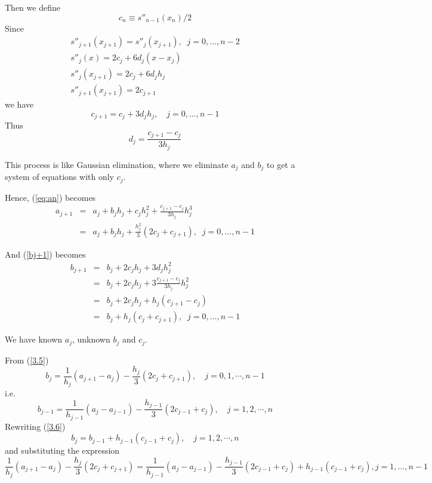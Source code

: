 Then we define \[
    c_n \equiv s''_{n-1}(x_n) /2
\]
Since \begin{gather*}
s''_{j+1}(x_{j+1}) = s''_j(x_{j+1}), 
\; \; j = 0, \ldots, n-2\\
s''_j(x) = 2c_j + 6d_j(x-x_j)\\
s''_j(x_{j+1}) = 2c_j + 6d_jh_j\\
s''_{j+1}(x_{j+1}) = 2c_{j+1}
\end{gather*}
we have \[
    c_{j+1} = c_j + 3d_j h_j, \quad j = 0, \ldots, n-1
\]
Thus \[
    d_j = \frac{c_{j+1} - c_j}{3h_j}
\]

\begin{note}
    This process is like Gaussian elimination, where we eliminate $a_j$ and $b_j$ to get a system of equations with only $c_j$.
\end{note}

Hence, (\ref{eq:an}) becomes \begin{eqnarray}
a_{j+1} 
&= &a_j + b_j h_j
+ c_j h_j^2
+ \frac{c_{j+1}-c_j}{3h_j} h_j^3\nonumber \\
&= &a_j + b_j h_j
+ \frac{h_j^2}{3}(2c_{j}+c_{j+1}),
\; \; j = 0, \ldots, n-1
\label{3.5}
\end{eqnarray}

And (\ref{bj+1}) becomes \begin{eqnarray}
b_{j+1} &= &b_j+ 2c_j h_j + 3d_j h_j^2 \nonumber\\
&=& b_j+ 2c_j h_j + 3\frac{c_{j+1}-c_j}{3h_j}
h_j^2 \nonumber\\
&=&  b_j+ 2c_j h_j + h_j(c_{j+1}-c_j)\nonumber\\
&=& b_j + h_j(c_j+c_{j+1}),
\; \; j = 0, \ldots,n-1
\label{3.6}
\end{eqnarray}

We have known $a_j$, unknown $b_j$ and $c_j$. 

From (\ref{3.5}) \[
    b_j = \frac{1}{h_j} (a_{j+1} - a_j) - \frac{h_j}{3}(2c_j + c_{j+1}), \quad j = 0,1,\cdots,n-1
\]
i.e. \[
    b_{j-1} = \frac{1}{h_{j-1}} (a_{j} - a_{j-1}) - \frac{h_{j-1}}{3}(2c_{j-1} + c_{j}), \quad j = 1,2,\cdots,n
\]
Rewriting (\ref{3.6}) \[
    b_j = b_{j-1} + h_{j-1}(c_{j-1}+c_j), \quad j = 1,2,\cdots,n
\]
and substituting the expression \begin{equation*}
\frac{1}{h_j}
(a_{j+1}-a_j) - \frac{h_j}{3}
(2c_{j}+c_{j+1}) =
\frac{1}{h_{j-1}}
(a_{j}-a_{j-1}) - \frac{h_{j-1}}{3}
(2c_{j-1}+c_{j}) + 
h_{j-1}(c_{j-1}+c_{j}),
j = 1, \ldots,n-1
\end{equation*}

\begin{note}
\end{note}

